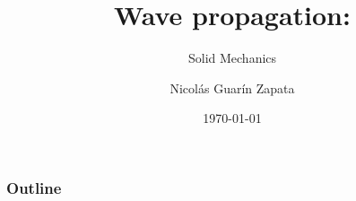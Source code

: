 \documentclass{beamer}
\begin{document}
\title[Wave propagation in solids] %
{Wave propagation:}
\subtitle{ Solid Mechanics}
\author[Guarin-Zapata, Nicolas] %
{Nicol\'as Guar\'in Zapata}
\date{\today}
\subject{Wave propagation}

\frame{\titlepage}

\begin{frame}
	\frametitle{Outline}
	\tableofcontents
\end{frame}
%

\end{document}

